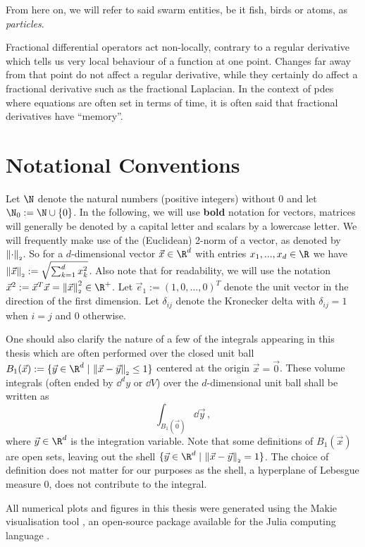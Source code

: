 From here on, we will refer to said swarm entities, be it fish, birds or atoms, as \textit{particles}.

Fractional differential operators act non-locally, contrary to a regular derivative which tells us very local behaviour of a function at one point.
Changes far away from that point do not affect a regular derivative, while they certainly do affect a fractional derivative such as the fractional Laplacian.
In the context of \gls{pde}s where equations are often set in terms of time, it is often said that fractional derivatives have ``memory''.

\section{Notational Conventions}
Let $\N$ denote the natural numbers (positive integers) without $0$ and let $\N_0 := \N \cup \{0\}$.
In the following, we will use \textbf{bold} notation for vectors, matrices will generally be denoted by a capital letter and scalars by a lowercase letter.
We will frequently make use of the (Euclidean) 2-norm of a vector, as denoted by $\left\lVert\cdot\right\rVert_{\scriptscriptstyle 2}$.
So for a $d$-dimensional vector $\vec{x} \in \R^d$ with entries $x_1, ..., x_d \in \R$ we have $\left\lVert\vec{x}\right\rVert_{\scriptscriptstyle 2} := \sqrt{\sum_{k=1}^d x_k^2}$.
Also note that for readability, we will use the notation $\vec{x}^2 := \vec{x}^T \vec{x} = \norm{\vec{x}}^2 \in \R^+$.
Let $\vec{e}_1 := (1, 0, ..., 0)^T$ denote the unit vector in the direction of the first dimension.
Let $\delta_{ij}$ denote the Kronecker delta with $\delta_{ij} = 1$ when $i=j$ and $0$ otherwise.

One should also clarify the nature of a few of the integrals appearing in this thesis which are often performed over the closed unit ball $B_1(\vec{x}) := \{\vec{y} \in \R^d \;|\, \norm{\vec{x} - \vec{y}} \le 1\}$ centered at the origin $\vec{x} = \vec{0}$.
These volume integrals (often ended by $\dd^d y$ or $\dd V$) over the $d$-dimensional unit ball shall be written as
$$\int_{B_1(\vec{0})} \dd\vec{y}\,,$$
where $\vec{y} \in \R^d$ is the integration variable.
Note that some definitions of $B_1(\vec{x})$ are open sets, leaving out the shell $\{\vec{y} \in \R^d \;|\, \norm{\vec{x} - \vec{y}} = 1\}$.
The choice of definition does not matter for our purposes as the shell, a hyperplane of Lebesgue measure $0$, does not contribute to the integral.

All numerical plots and figures in this thesis were generated using the Makie visualisation tool \parencite{2021-makie}, an open-source package available for the Julia computing language \parencite{2017-julia}.

